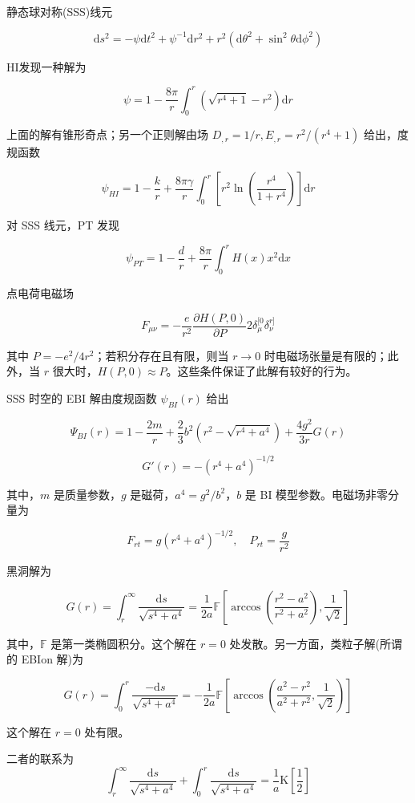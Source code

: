 \documentclass[aps,prl,preprint,groupedaddress]{revtex4-2}
\begin{document}
静态球对称(SSS)线元

$$
\mathrm{d}s^2 = -\psi\mathrm{d}t^2 + \psi^{-1} \mathrm{d}r^2 + r^2\left(\mathrm{d}\theta^2+\sin^2\theta\mathrm{d}\phi^2 \right)
$$

HI发现一种解为

$$
\psi
=1-\frac{8\pi }{r } \int_{0}^{r} \left(\sqrt{r^4+1} - r^2 \right)\mathrm{d}r
$$

上面的解有锥形奇点；另一个正则解由场 $D_{,r}=1/r,E_{,r}=r^2/\left(r^4+1 \right) $ 给出，度规函数

$$
\psi_{HI}
=1-\frac{k }{r } + \frac{8\pi\gamma }{r } \int_{0}^{r} \left[r^2\ln\left(\frac{r^4 }{1+r^4 }  \right) \right] \mathrm{d}r
$$

对 SSS 线元，PT 发现

$$
\psi_{PT}
=1-\frac{d }{r } + \frac{8\pi }{r } \int_{0}^{r} H(x) x^2\mathrm{d}x
$$

点电荷电磁场

$$
F_{\mu\nu}
=-\frac{e }{r^2 } \frac{\partial H(P,0) }{\partial P } 2\delta_\mu^{[0}\delta_{\nu}^{r]}
$$

其中 $P=-e^2/4r^2$；若积分存在且有限，则当 $r\to 0$ 时电磁场张量是有限的；此外，当 $r$ 很大时，$H(P,0)\approx P$。这些条件保证了此解有较好的行为。

SSS 时空的 EBI 解由度规函数 $\psi_{BI}(r)$ 给出

$$
\Psi_{BI}(r)
=1-\frac{2m }{r } + \frac{2 }{3 } b^2\left(r^2-\sqrt{r^4+a^4} \right) + \frac{4g^2 }{3r } G(r)
$$

$$
G'(r)
=-\left(r^4+a^4 \right)^{-1/2}
$$

其中，$m$ 是质量参数，$g$ 是磁荷，$a^4=g^2/b^2$，$b$ 是 BI 模型参数。电磁场非零分量为

$$
F_{rt}
=g\left(r^4+a^4 \right)^{-1/2},\quad
P_{rt}
=\frac{g }{r^2 }
$$

黑洞解为

$$
G(r)
=\int_{r}^{\infty} \frac{\mathrm{d}s }{\sqrt{s^4+a^4} } 
=\frac{1 }{2a } \mathbb{F} \left[\arccos\left(\frac{r^2-a^2 }{r^2+a^2 }  \right) , \frac{1 }{\sqrt{2} }  \right]
$$

其中，$\mathbb{F}$ 是第一类椭圆积分。这个解在 $r=0$ 处发散。另一方面，类粒子解(所谓的 EBIon 解)为

$$
G(r)
=\int_{0}^{r} \frac{-\mathrm{d}s }{\sqrt{s^4+a^4} } 
=-\frac{1 }{2a } \mathbb{F}\left[\arccos\left(\frac{a^2-r^2 }{a^2+r^2 } , \frac{1 }{\sqrt{2} }  \right) \right]
$$

这个解在 $r=0$ 处有限。

二者的联系为
$$
\int_r ^{\infty} \frac{\mathrm{d}s }{\sqrt{s^4+a^4} } + \int_0^r \frac{\mathrm{d}s }{\sqrt{s^4+a^4} } 
=\frac{1 }{a } \mathrm{K}\left[\frac{1 }{2 }  \right] 
$$
\end{document}
